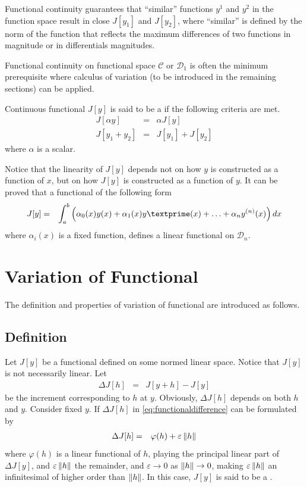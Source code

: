 Functional continuity guarantees that ``similar'' functions $y^1$ and $y^2$ in the function space result in close $J[y_1]$ and $J[y_2]$, where ``similar'' is defined by the norm of the function that reflects the maximum differences of two functions in magnitude or in differentials magnitudes.

Functional continuity on functional space $\mathcal{C}$ or $\mathcal{D}_1$ is often the minimum prerequisite where calculus of variation (to be introduced in the remaining sections) can be applied.
 
Continuous functional $J[y]$ is said to be a  if the following criteria are met.
\begin{eqnarray}
  J[\alpha y] &=& \alpha J[y] \nonumber \\
  J[y_1 + y_2] &=& J[y_1] + J[y_2] \nonumber
\end{eqnarray}
where $\alpha$ is a scalar.

Notice that the linearity of $J[y]$ depends not on how $y$ is constructed as a function of $x$, but on how $J[y]$ is constructed as a function of $y$. It can be proved that a functional of the following form
\begin{eqnarray}
  J[y] &=& \int_{a}^{b}\left(\alpha_0(x)y(x) + \alpha_1(x)y\textprime(x) + \ldots + \alpha_n y^{(n)}(x)\right)dx
\end{eqnarray}
where $\alpha_i(x)$ is a fixed function, defines a linear functional on $\mathcal{D}_n$. 
 
\section{Variation of Functional}

The definition and properties of variation of functional are introduced as follows.

\subsection{Definition}

Let $J[y]$ be a functional defined on some normed linear space. Notice that $J[y]$ is not necessarily linear. Let
\begin{eqnarray}
\Delta J[h] &=& J[y + h] - J[y] \label{eq:functionaldifference}
\end{eqnarray}
be the increment corresponding to $h$ at $y$. Obviously, $\Delta J[h]$ depends on both $h$ and $y$. 
Consider fixed $y$. If $\Delta J[h]$ in \eqref{eq:functionaldifference} can be formulated by
\begin{eqnarray}
  \Delta J[h] &=& \varphi(h) + \varepsilon \left\lVert h\right\rVert \label{eq:differential_of_functional}
\end{eqnarray}
where $\varphi(h)$ is a linear functional of $h$, playing the principal linear part of $\Delta J[y]$, and $\varepsilon \left\lVert h\right\rVert$ the remainder, and $\varepsilon \rightarrow 0$ as $\left\lVert h\right\rVert \rightarrow 0$, making $\varepsilon \left\lVert h\right\rVert$ an infinitesimal of higher order than $\left\lVert h\right\rVert$. In this case, $J[y]$ is said to be a . 

